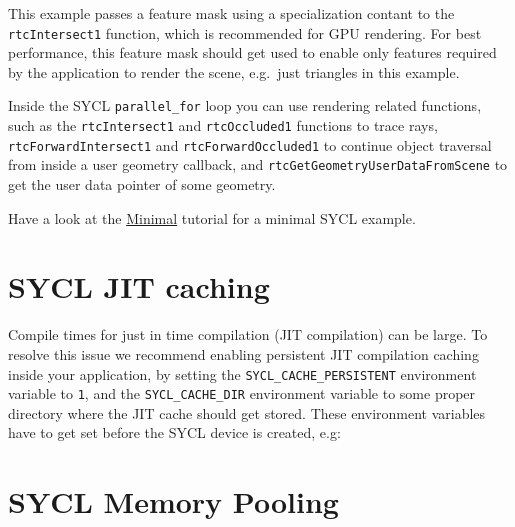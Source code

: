 This example passes a feature mask using a specialization contant to the
\texttt{rtcIntersect1} function, which is recommended for GPU rendering.
For best performance, this feature mask should get used to enable only
features required by the application to render the scene, e.g.~just
triangles in this example.

Inside the SYCL \texttt{parallel\_for} loop you can use rendering
related functions, such as the \texttt{rtcIntersect1} and
\texttt{rtcOccluded1} functions to trace rays,
\texttt{rtcForwardIntersect1} and \texttt{rtcForwardOccluded1} to
continue object traversal from inside a user geometry callback, and
\texttt{rtcGetGeometryUserDataFromScene} to get the user data pointer of
some geometry.

Have a look at the \hyperref[minimal]{Minimal} tutorial for a minimal
SYCL example.

\section{SYCL JIT caching}\label{sycl-jit-caching}

Compile times for just in time compilation (JIT compilation) can be
large. To resolve this issue we recommend enabling persistent JIT
compilation caching inside your application, by setting the
\texttt{SYCL\_CACHE\_PERSISTENT} environment variable to \texttt{1}, and
the \texttt{SYCL\_CACHE\_DIR} environment variable to some proper
directory where the JIT cache should get stored. These environment
variables have to get set before the SYCL device is created, e.g:

\begin{Shaded}
\begin{Highlighting}[]
\OperatorTok{(}\OperatorTok{,}\OperatorTok{,}\OperatorTok{);}
\OperatorTok{(}\OperatorTok{,}\OperatorTok{,}\OperatorTok{);}

\OperatorTok{::}\OperatorTok{(}\OperatorTok{);}
\end{Highlighting}
\end{Shaded}

\section{SYCL Memory Pooling}\label{sycl-memory-pooling}

